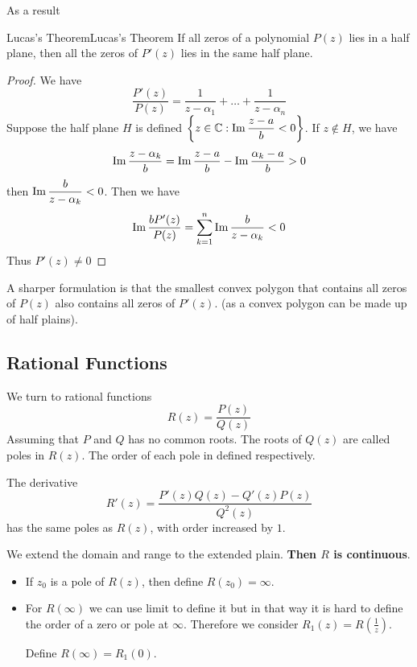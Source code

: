 \documentclass[../main.tex]{subfiles}
\begin{document}
As a result
\begin{theorem}{Lucas's Theorem}{Lucas's Theorem}
If all zeros of a polynomial $P(z)$ lies in a half plane, then all the zeros of $P'(z)$ lies in the same half plane.
\end{theorem}
\begin{proof}
We have
\begin{equation}
\frac{P'(z)}{P(z)} = \frac{1}{z-\alpha_1}+\ldots +\frac{1}{z-\alpha_n}
\end{equation}
Suppose the half plane $H$ is defined $\displaystyle \left\{ z\in \mathbb{C}: \operatorname{Im} \frac{z-a}{b}<0 \right\}$. If $z\notin H$, we have
\begin{equation*}
\operatorname{Im} \frac{z-\alpha_k}{b} = \operatorname{Im} \frac{z-a}{b}-\operatorname{Im} \frac{\alpha_k-a}{b} > 0
\end{equation*}
then $\displaystyle \operatorname{Im} \frac{b}{z-\alpha_k}<0$. Then we have
\begin{equation*}
\operatorname{Im} \frac{bP'(z)}{P(z)} = \sum_{k=1}^{n} \operatorname{Im} \frac{b}{z-\alpha_k}<0
\end{equation*}
Thus $P'(z)\neq 0$
\end{proof}

A sharper formulation is that the smallest convex polygon that contains all zeros of $P(z)$ also contains all zeros of $P'(z)$. (as a convex polygon can be made up of half plains).

\subsection{Rational Functions}
We turn to rational functions
\begin{equation}
R(z) = \frac{P(z)}{Q(z)}
\end{equation}
Assuming that $P$ and $Q$ has no common roots. The roots of $Q(z)$ are called poles in $R(z)$. The order of each pole in defined respectively.

The derivative 
\begin{equation*}
R'(z) = \frac{P'(z)Q(z)-Q'(z)P(z)}{Q^2(z)}
\end{equation*}
has the same poles as $R(z)$, with order increased by $1$.

We extend the domain and range to the extended plain. \textbf{Then $R$ is continuous}.
\begin{itemize}
\item If $z_0$ is a pole of $R(z)$, then define $R(z_0)= \infty $.
\item For $R(\infty )$ we can use limit to define it but in that way it is hard to define the order of a zero or pole at $\infty $. Therefore we consider $R_1(z) = R(\frac{1}{z})$. 

Define $R(\infty )=R_1(0)$.
\end{itemize}
\end{document}
